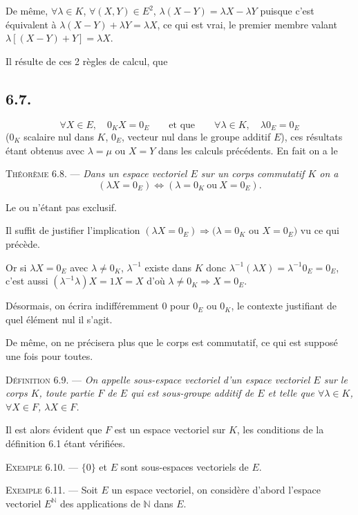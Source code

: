 De même, $\forall\lambda\in K$, $\forall(X,Y)\in E^2$, $\lambda(X-Y)=\lambda X-\lambda Y$ puisque c'est équivalent à $\lambda(X-Y)+\lambda Y=\lambda X$, ce qui est vrai, le premier membre valant $\lambda[(X-Y)+Y]=\lambda X$.

Il résulte de ces 2 règles de calcul, que

\subsection*{6.7.}
\[
\forall X\in E,\quad 0_KX=0_E\qquad\text{et que}\qquad \forall\lambda\in K,\quad \lambda0_E=0_E
\]
($0_K$ scalaire nul dans $K$, $0_E$, vecteur nul dans le groupe additif $E$), ces résultats étant obtenus avec $\lambda=\mu$ ou $X=Y$ dans les calculs précédents. En fait on a le

\medskip\noindent\textsc{Théorème 6.8.} --- \emph{Dans un espace vectoriel $E$ sur un corps commutatif $K$ on a
\[
(\lambda X=0_E)\Longleftrightarrow(\lambda=0_K\ \text{ou}\ X=0_E).
\]}

Le ou n'étant pas exclusif.

Il suffit de justifier l'implication $(\lambda X=0_E)\Rightarrow(\lambda=0_K$ ou $X=0_E)$ vu ce qui précède.

Or si $\lambda X=0_E$ avec $\lambda\ne0_K$, $\lambda^{-1}$ existe dans $K$ donc $\lambda^{-1}(\lambda X)=\lambda^{-1}0_E=0_E$, c'est aussi $(\lambda^{-1}\lambda)X=1X=X$ d'où $\lambda\ne0_K\Rightarrow X=0_E$. \bookend

Désormais, on écrira indifféremment 0 pour $0_E$ ou $0_K$, le contexte justifiant de quel élément nul il s'agit.

De même, on ne précisera plus que le corps est commutatif, ce qui est supposé une fois pour toutes.


\medskip\noindent\textsc{Définition 6.9.} --- \emph{On appelle sous-espace vectoriel d'un espace vectoriel $E$ sur le corps $K$, toute partie $F$ de $E$ qui est sous-groupe additif de $E$ et telle que $\forall\lambda\in K$, $\forall X\in F$, $\lambda X\in F$.}

Il est alors évident que $F$ est un espace vectoriel sur $K$, les conditions de la définition 6.1 étant vérifiées.

\medskip\noindent\textsc{Exemple 6.10.} --- $\{0\}$ et $E$ sont sous-espaces vectoriels de $E$.

\medskip\noindent\textsc{Exemple 6.11.} --- Soit $E$ un espace vectoriel, on considère d'abord l'espace vectoriel $E^{\mathbb N}$ des applications de $\mathbb N$ dans $E$.

